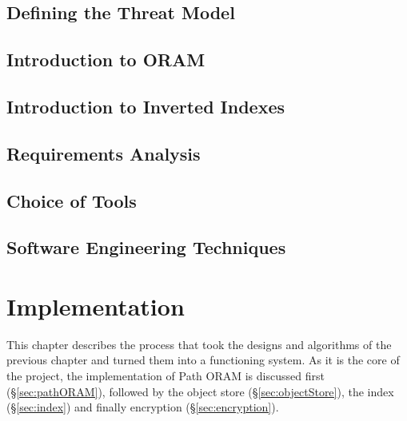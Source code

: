 \documentclass[12pt,a4paper,twoside,openright]{report}
\begin{document}


\section{Defining the Threat Model}
\label{sec:threatmodel}

\section{Introduction to ORAM}
\label{sec:oramintro}


\section{Introduction to Inverted Indexes}


\section{Requirements Analysis}


\section{Choice of Tools}


\section{Software Engineering Techniques}



\chapter{Implementation}

This chapter describes the process that took the designs and algorithms of the previous chapter and turned them into a functioning system. As it is the core of the project, the implementation of Path ORAM is discussed first (\S\ref{sec:pathORAM}), followed by the object store (\S\ref{sec:objectStore}), the index (\S\ref{sec:index}) and finally encryption (\S\ref{sec:encryption}).
\end{document}
